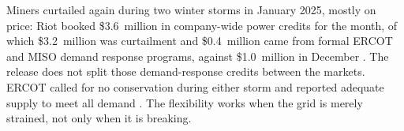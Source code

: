 Miners curtailed again during two winter storms in January 2025, mostly on price: Riot booked \$3.6~million in company-wide power credits for the month, of which \$3.2~million was curtailment and \$0.4~million came from formal ERCOT and MISO demand response programs, against \$1.0~million in December \autocite{Riot2025Jan}. The release does not split those demand-response credits between the markets. ERCOT called for no conservation during either storm and reported adequate supply to meet all demand \autocite{ERCOTMonthlyJan2025}. The flexibility works when the grid is merely strained, not only when it is breaking. %

